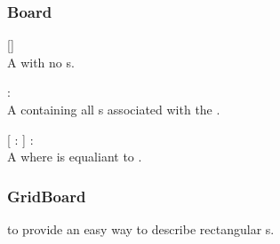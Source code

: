 \subsubsection{Board}
\begin{dlist}
  \item {}[]\\
  A  with no s.
  
  \item {} : \\
  A  containing all s associated with the .
  
  \item {}[  :  ] : \\
  A  where  is equaliant to .
\end{dlist}

\subsubsection{GridBoard}
   to provide an easy way to describe rectangular s.

